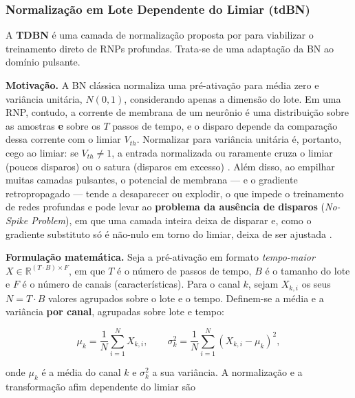 			\subsubsection{Normalização em Lote Dependente do Limiar (tdBN)}
				\label{sec:tdbn}

				\par A \textbf{\ac{TDBN}} é uma camada de normalização proposta por  para viabilizar o treinamento direto de RNPs profundas. Trata-se de uma adaptação da \ac{BN} \cite{ioffe2015batchnorm} ao domínio pulsante.

				\par \textbf{Motivação.} A BN clássica normaliza uma pré-ativação para média zero e variância unitária, $N(0,1)$, considerando apenas a dimensão do lote. Em uma RNP, contudo, a corrente de membrana de um neurônio é uma distribuição sobre as amostras \textbf{e} sobre os $T$ passos de tempo, e o disparo depende da comparação dessa corrente com o limiar $V_{th}$. Normalizar para variância unitária é, portanto, cego ao limiar: se $V_{th}\neq 1$, a entrada normalizada ou raramente cruza o limiar (poucos disparos) ou o satura (disparos em excesso) \cite{zheng2021goingdeeper}. Além disso, ao empilhar muitas camadas pulsantes, o potencial de membrana --- e o gradiente retropropagado --- tende a desaparecer ou explodir, o que impede o treinamento de redes profundas e pode levar ao \textbf{problema da ausência de disparos} (\textit{No-Spike Problem}), em que uma camada inteira deixa de disparar e, como o gradiente substituto só é não-nulo em torno do limiar, deixa de ser ajustada \cite{zheng2021goingdeeper}.

				\par \textbf{Formulação matemática.} Seja a pré-ativação em formato \textit{tempo-maior} $X \in \mathbb{R}^{(T\cdot B)\times F}$, em que $T$ é o número de passos de tempo, $B$ é o tamanho do lote e $F$ é o número de canais (características). Para o canal $k$, sejam $X_{k,i}$ os seus $N = T\cdot B$ valores agrupados sobre o lote e o tempo. Definem-se a média e a variância \textbf{por canal}, agrupadas sobre lote e tempo:

				\begin{equation}
					\label{eq:tdbn-stats}
					\mu_k = \frac{1}{N}\sum_{i=1}^{N} X_{k,i}, \qquad
					\sigma_k^2 = \frac{1}{N}\sum_{i=1}^{N}\left(X_{k,i}-\mu_k\right)^2,
				\end{equation}

				\par onde $\mu_k$ é a média do canal $k$ e $\sigma_k^2$ a sua variância. A normalização e a transformação afim dependente do limiar são

